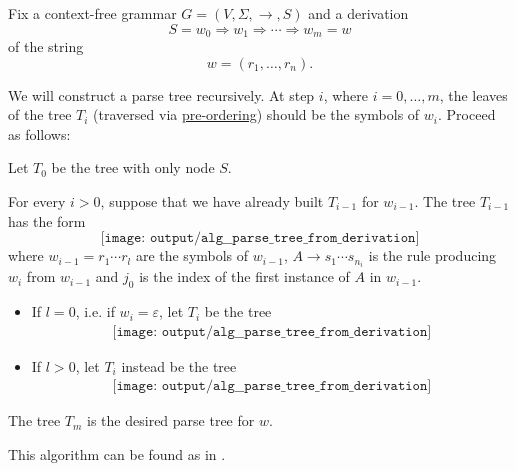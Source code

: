 \begin{algorithm}\label{alg:derivation_to_parse_tree}
  Fix a context-free grammar \( G = (V, \Sigma, \to, S) \) and a derivation
  \begin{equation*}
    S = w_0 \Rightarrow w_1 \Rightarrow \cdots \Rightarrow w_m = w
  \end{equation*}
  of the string
  \begin{equation*}
    w = (r_1, \ldots, r_n).
  \end{equation*}

  We will construct a parse tree recursively. At step \( i \), where \( i = 0, \ldots, m \), the leaves of the tree \( T_i \) (traversed via \hyperref[def:traversal_ordering]{pre-ordering}) should be the symbols of \( w_i \). Proceed as follows:
  \begin{thmenum}
     Let \( T_0 \) be the tree with only node \( S \).

     For every \( i > 0 \), suppose that we have already built \( T_{i-1} \) for \( w_{i-1} \). The tree \( T_{i-1} \) has the form
    \begin{equation*}
      \texttt{[image: output/alg\_\_parse\_tree\_from\_derivation]}
    \end{equation*}
    where \( w_{i-1} = r_1 \cdots r_l \) are the symbols of \( w_{i-1} \), \( A \to s_1 \cdots s_{n_i} \) is the rule producing \( w_i \) from \( w_{i-1} \) and \( j_0 \) is the index of the first instance of \( A \) in \( w_{i-1} \).

    \begin{itemize}
      \item If \( l = 0 \), i.e. if \( w_i = \varepsilon \), let \( T_i \) be the tree
      \begin{equation*}
        \begin{aligned}
          \texttt{[image: output/alg\_\_parse\_tree\_from\_derivation]}
        \end{aligned}
      \end{equation*}

      \item If \( l > 0 \), let \( T_i \) instead be the tree
      \begin{equation*}
        \begin{aligned}
          \texttt{[image: output/alg\_\_parse\_tree\_from\_derivation]}
        \end{aligned}
      \end{equation*}
    \end{itemize}
  \end{thmenum}

   The tree \( T_m \) is the desired parse tree for \( w \).
\end{algorithm}
\begin{comments}
  \item This algorithm can be found as  in \cite{code}.
\end{comments}

